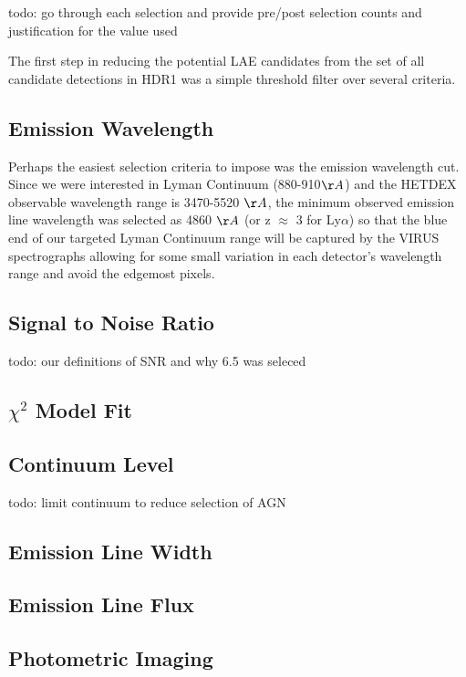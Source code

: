 \documentclass{aastex62}
\begin{document}
todo: go through each selection and provide pre/post selection counts and justification for the value used

The first step in reducing the potential LAE candidates from the set of all candidate detections in HDR1 was a simple threshold filter over several criteria. 

\subsection{Emission Wavelength}
Perhaps the easiest selection criteria to impose was the emission wavelength cut. Since we were interested in Lyman Continuum (880-910$\AA$) and the HETDEX observable wavelength range is 3470-5520 $\AA$, the minimum observed emission line wavelength was selected as 4860 $\AA$ (or z $\approx$ 3 for Ly$\alpha$) so that the blue end of our targeted Lyman Continuum range will be captured by the VIRUS spectrographs allowing for some small variation in each detector's wavelength range and avoid the edgemost pixels.

\subsection{Signal to Noise Ratio}
{ \color{red} todo: our definitions of SNR and why 6.5 was seleced }

\subsection{$\chi ^{2}$ Model Fit}

\subsection{Continuum Level}
{ \color{red} todo: limit continuum to reduce selection of AGN}

\subsection{Emission Line Width}

\subsection{Emission Line Flux}

\subsection{Photometric Imaging}
\end{document}
